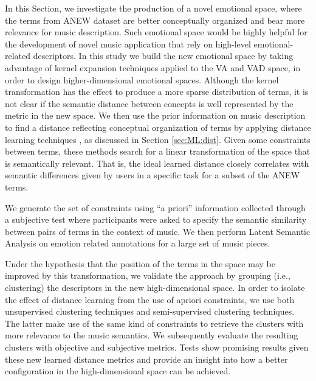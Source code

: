 In this Section, we investigate the production of a novel emotional space, where the terms from ANEW dataset are better conceptually organized and bear more relevance for music description. Such emotional space would be highly helpful for the development of novel music application that rely on high-level emotional-related descriptors. In this study we build the new emotional space by taking advantage of kernel expansion techniques applied to the VA and VAD space, in order to design higher-dimensional emotional spaces.  Although the kernel transformation has the effect to produce a more sparse distribution of terms, it is not clear if the  semantic distance between concepts is well represented by the metric in the new space. We then use the prior information on music description to find a distance reflecting conceptual organization of terms by applying distance learning techniques \cite{xing2003distance, bar2003learning, goldberger2004neighbourhood}, as discussed in Section \ref{sec:ML:dist}. Given some constraints between terms, these methods search for a linear transformation of the space that is semantically relevant. That is, the ideal learned distance closely correlates with semantic differences given by users in a specific task for a subset of the ANEW terms. 

We generate the set of constraints using ``a priori'' information collected through a subjective test where participants were asked to specify the semantic similarity between pairs of terms in the context of music. We then perform Latent Semantic Analysis on emotion related annotations for a large set of music pieces. 

Under the hypothesis that the position of the terms in the space may be improved by this transformation, we validate the approach by grouping (i.e.,  clustering) the descriptors in the new high-dimensional space. In order to isolate the effect of distance learning from the use of apriori constraints, we use both unsupervised clustering techniques and semi-supervised clustering techniques. The latter make use of the same kind of constraints to retrieve the clusters with more relevance to the music semantics. We subsequently evaluate the resulting clusters with objective and subjective metrics. Tests show promising results given these new learned distance metrics and provide an insight into how a better configuration in the high-dimensional space can be achieved. 


